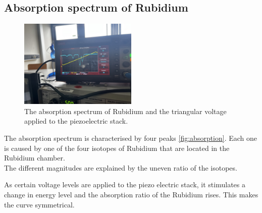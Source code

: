 \subsection{Absorption spectrum of Rubidium}
\begin{figure}
  \centering
  \includegraphics[width=0.5\textwidth]{content/absorption.jpg}
  \caption{The absorption spectrum of Rubidium and the triangular voltage applied to the piezoelectric stack.}
  \label{fig:absorption}
\end{figure}
The absorption spectrum is characterised by four peaks \autoref{fig:absorption}. Each one is caused by one of the four isotopes of Rubidium that 
are located in the Rubidium chamber. \\
The different magnitudes are explained by the uneven ratio of the isotopes. 

As certain voltage levels are applied to the piezo electric stack, it stimulates a change in energy level
and the absorption ratio of the Rubidium rises. This makes the curve symmetrical.





